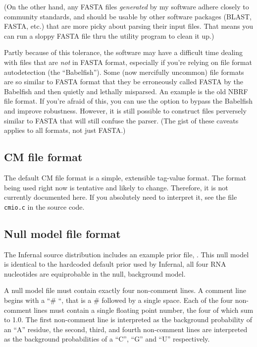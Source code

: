 (On the other hand, any FASTA files \emph{generated} by my software
adhere closely to community standards, and should be usable by other
software packages (BLAST, FASTA, etc.) that are more picky about
parsing their input files. That means you can run a sloppy FASTA file
thru the  utility program to clean it up.)

Partly because of this tolerance, the software may have a difficult
time dealing with files that are \textit{not} in FASTA format,
especially if you're relying on file format autodetection (the
``Babelfish'').  Some (now mercifully uncommon) file formats are so
similar to FASTA format that they be erroneously called FASTA by the
Babelfish and then quietly and lethally misparsed. An example is the
old NBRF file format. If you're afraid of this, you can use the
 option to bypass the Babelfish and improve
robustness. However, it is still possible to construct files
perversely similar to FASTA that will still confuse the parser.  (The
gist of these caveats applies to all formats, not just FASTA.)

\subsection{CM file format}

The default CM file format is a simple, extensible tag-value format.
The format being used right now is tentative and likely to
change. Therefore, it is not currently documented here. If you
absolutely need to interpret it, see the file \verb+cmio.c+ in the
source code.

\subsection{Null model file format}

The Infernal source distribution includes an example prior file, 
. This null model is identical to the hardcoded default
prior used by Infernal, all four RNA nucleotides are equiprobable in
the null, background model. 

A null model file must contain exactly four non-comment lines. A
comment line begins with a ``\# ``, that is a \# followed by a single
space. Each of the four non-comment lines must contain a single floating point
number, the four of which sum to 1.0. The first non-comment line is interpreted as
the background probability of an ``A'' residue, the second, third, and
fourth non-comment lines are interpreted as the background
probabilities of a ``C'', ``G'' and ``U'' respectively. 




